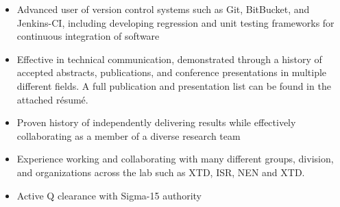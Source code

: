 \begin{center}
\begin{minipage}{\textwidth}
\begin{itemize}[leftmargin=.45in,rightmargin=.45in,itemsep=1.6mm]
	\item Advanced user of version control systems such as Git, BitBucket, and Jenkins-CI, including developing regression and unit testing frameworks for continuous integration of software

	\item Effective in technical communication, demonstrated through a history of accepted abstracts, publications, and conference presentations in multiple different fields. A full publication and presentation list can be found in the attached r\'{e}sum\'{e}.

	\item Proven history of independently delivering results while effectively collaborating as a member of a diverse research team

	\item Experience working and collaborating with many different groups, division, and organizations across the lab such as XTD, ISR, NEN and XTD. 

	\item Active Q clearance with Sigma-15 authority
	
		
	



\end{itemize}
\end{minipage}
\end{center}
